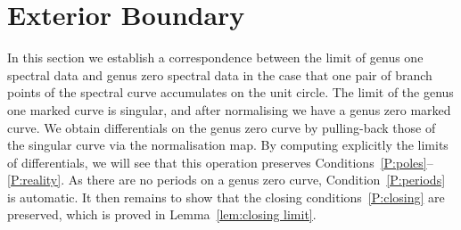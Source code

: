%
%
%







\section{Exterior Boundary}
\label{sec:Exterior}

In this section we establish a correspondence between the limit of genus one spectral data and genus zero spectral data in the case that one pair of branch points of the spectral curve accumulates on the unit circle. The limit of the genus one marked curve is singular, and after normalising we have a genus zero marked curve. We obtain differentials on the genus zero curve by pulling-back those of the singular curve via the normalisation map. By computing explicitly the limits of differentials, we will see that this operation preserves Conditions~\ref{P:poles}--\ref{P:reality}. As there are no periods on a genus zero curve, Condition~\ref{P:periods} is automatic. It then remains to show that the closing conditions~\ref{P:closing} are preserved, which is proved in Lemma~\ref{lem:closing limit}.

